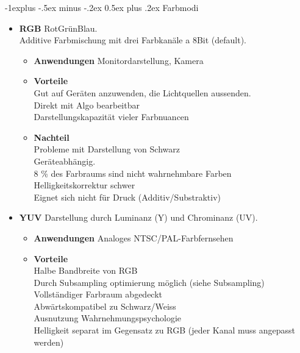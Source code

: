 \documentclass[10pt,landscape]{article}
\makeatletter
\renewcommand{\subsection}{\@startsection{subsection}{2}{0mm}%
                                {-1explus -.5ex minus -.2ex}%
                                {0.5ex plus .2ex}%
                                {\normalfont\normalsize\bfseries}}
\makeatother
\begin{document}
\begin{multicols}{3}
\subsection{Farbmodi}
\begin{itemize}
    \item \textbf{RGB} RotGr\"unBlau.\\
        Additive Farbmischung mit drei Farbkan\"ale a 8Bit (default).
        \begin{itemize}
            \item \textbf{Anwendungen} Monitordarstellung, Kamera
            \item \textbf{Vorteile} \\
                Gut auf Ger\"aten anzuwenden, die Lichtquellen aussenden.\\
                Direkt mit Algo bearbeitbar\\
                Darstellungskapazit\"at vieler Farbnuancen
            \item \textbf{Nachteil} \\
                Probleme mit Darstellung von Schwarz \\
                Ger\"ateabh\"angig. \\
                8 \% des Farbraums sind nicht wahrnehmbare Farben \\
                Helligkeitskorrektur schwer \\
                Eignet sich nicht f\"ur Druck (Additiv/Substraktiv)
        \end{itemize}
    \item \textbf{YUV}
        Darstellung durch Luminanz (Y) und Chrominanz (UV).
        \begin{itemize}
            \item \textbf{Anwendungen} Analoges NTSC/PAL-Farbfernsehen
            \item \textbf{Vorteile} \\
                Halbe Bandbreite von RGB \\
                Durch Subsampling optimierung m\"oglich (siehe Subsampling)\\
                Vollst\"andiger Farbraum abgedeckt\\
                Abw\"artskompatibel zu Schwarz/Weiss\\
                Ausnutzung Wahrnehmungspsychologie\\
                Helligkeit separat im Gegensatz zu RGB (jeder Kanal muss angepasst werden)\\

\end{itemize}
\end{itemize}
\end{multicols}
\end{document}
